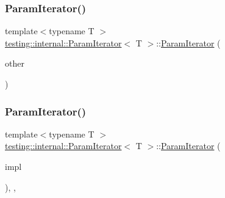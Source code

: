 \subsubsection{\texorpdfstring{ParamIterator()}{ParamIterator()}\hspace{0.1cm}{\footnotesize\ttfamily [1/6]}}
{\footnotesize\ttfamily template$<$typename T $>$ \\
\mbox{\hyperlink{classtesting_1_1internal_1_1_param_iterator}{testing\+::internal\+::\+Param\+Iterator}}$<$ T $>$\+::\mbox{\hyperlink{classtesting_1_1internal_1_1_param_iterator}{Param\+Iterator}} (\begin{DoxyParamCaption}\item[{const \mbox{\hyperlink{classtesting_1_1internal_1_1_param_iterator}{Param\+Iterator}}$<$ T $>$ \&}]{other }\end{DoxyParamCaption})\hspace{0.3cm}{\ttfamily [inline]}}

\mbox{\label{classtesting_1_1internal_1_1_param_iterator_acf5ad898e7f50eb82a6c367889aa07c4}} 
\subsubsection{\texorpdfstring{ParamIterator()}{ParamIterator()}\hspace{0.1cm}{\footnotesize\ttfamily [2/6]}}
{\footnotesize\ttfamily template$<$typename T $>$ \\
\mbox{\hyperlink{classtesting_1_1internal_1_1_param_iterator}{testing\+::internal\+::\+Param\+Iterator}}$<$ T $>$\+::\mbox{\hyperlink{classtesting_1_1internal_1_1_param_iterator}{Param\+Iterator}} (\begin{DoxyParamCaption}\item[{\mbox{\hyperlink{classtesting_1_1internal_1_1_param_iterator_interface}{Param\+Iterator\+Interface}}$<$ T $>$ $\ast$}]{impl }\end{DoxyParamCaption})\hspace{0.3cm}{\ttfamily [inline]}, {\ttfamily [explicit]}, {\ttfamily [private]}}

\mbox{\label{classtesting_1_1internal_1_1_param_iterator_aa10585055ee055e304703a3004f24f33}} 
